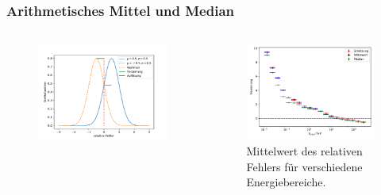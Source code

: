 \documentclass[aspectratio=1610, professionalfonts, 9pt]{beamer}
\begin{document}
  \begin{frame}
    \frametitle{Arithmetisches Mittel und Median}
    \begin{columns}
      \begin{figure}
        \includegraphics[width=\textwidth]{pictures/Resolution_bias_plot.pdf}
        \caption{}
        \label{}
      \end{figure}
      \begin{figure}
        \includegraphics[width=\textwidth]{pictures/RF_mean_bias.pdf}
        \caption{Mittelwert des relativen Fehlers für verschiedene Energiebereiche.}
        \label{}
      \end{figure}
    \end{columns}
  \end{frame}
\end{document}
